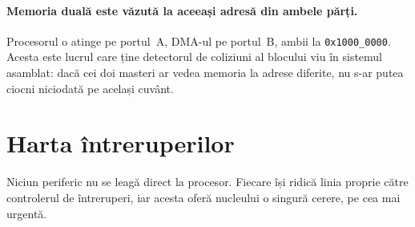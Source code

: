 \documentclass[11pt,openany]{report}
\begin{document}
\paragraph{Memoria duală este văzută la aceeași adresă din ambele părți.}
Procesorul o atinge pe portul~A, DMA-ul pe portul~B, ambii la
\texttt{0x1000\_0000}. Acesta este lucrul care ține detectorul de coliziuni al
blocului viu în sistemul asamblat: dacă cei doi masteri ar vedea memoria la
adrese diferite, nu s-ar putea ciocni niciodată pe același cuvânt.

\section{Harta întreruperilor}

Niciun periferic nu se leagă direct la procesor. Fiecare își ridică linia
proprie către controlerul de întreruperi, iar acesta oferă nucleului o singură
cerere, pe cea mai urgentă.
\end{document}
